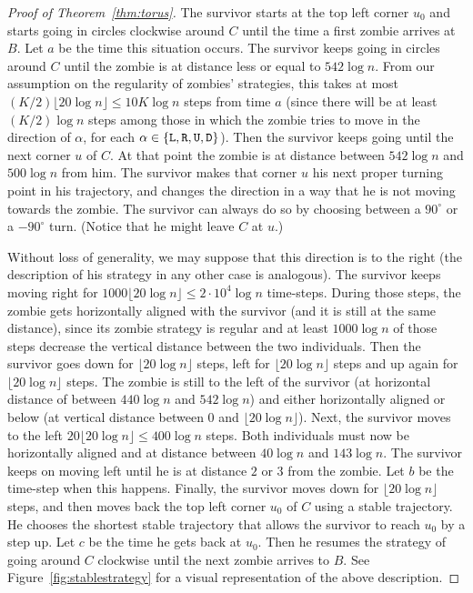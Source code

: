 \documentclass[12pt]{amsart}
\begin{document}
\begin{proof}[Proof of Theorem~\ref{thm:torus}]
The survivor starts at the top left corner $u_0$ and starts going in circles clockwise around $C$ until the time a first zombie arrives at $B$. Let $a$ be the time this situation occurs. The survivor keeps
going in circles around $C$ until the zombie is at distance  less or equal to $542\log n$. From our assumption on the regularity of zombies' strategies, this takes at most $  (K/2) \lfloor 20 \log n \rfloor \le  10K\log n$ steps from time $a$ (since
there will be at least $(K/2) \log n$ steps among those in which the zombie tries to move in the direction of $\alpha$, for each $\alpha\in\{{\mathtt L},{\mathtt R},{\mathtt U},{\mathtt D}\}$). Then the survivor keeps going until
the next corner $u$ of $C$. At that point the zombie is at distance between $542\log n$ and $500\log n$ from him. The survivor makes that corner $u$ his next proper turning point in his
trajectory, and changes the direction in a way that he is not moving towards the zombie. The survivor can always do so by choosing between a $90^\circ$ or a $-90^\circ$ turn.  (Notice that he might leave $C$ at $u$.)

Without loss of generality, we may suppose that
this direction is to the right (the description of his strategy in any other case is analogous). The survivor keeps moving right for $ 1000 \lfloor 20 \log n \rfloor \le  2 \cdot 10^4 \log n$ time-steps. During those steps, the zombie gets
horizontally aligned with the survivor (and it is still at the same distance), since its zombie strategy is regular and at least $1000\log n$ of those steps decrease the vertical distance between the
two individuals. Then the survivor goes down for $ \lfloor 20\log n \rfloor $ steps, left for $ \lfloor 20\log n \rfloor $ steps and up again for $ \lfloor 20\log n \rfloor $ steps. The zombie is still to the left of the survivor (at horizontal
distance of between $440\log n$ and $542\log n$) and either horizontally aligned or below (at vertical distance between $0$ and $ \lfloor 20\log n \rfloor $). Next, the survivor moves to the left $ 20\lfloor 20\log n \rfloor \le 400\log n$ steps.
Both individuals must now be horizontally aligned and at distance between $40\log n$ and $143\log n$. The survivor keeps on moving left until he is at distance $2$ or $3$ from the zombie. Let $b$
be the time-step when this happens. Finally, the survivor moves down for $ \lfloor 20\log n \rfloor$ steps, and then moves back the top left corner $u_0$ of $C$ using a stable trajectory. He chooses the shortest
stable trajectory that allows the survivor to reach $u_0$ by a step up. Let $c$ be the time he gets back at $u_0$. Then he resumes the strategy of going around $C$ clockwise until the next zombie arrives to $B$.
See Figure~\ref{fig:stablestrategy} for a visual representation of the above description.


\end{proof}
\end{document}
